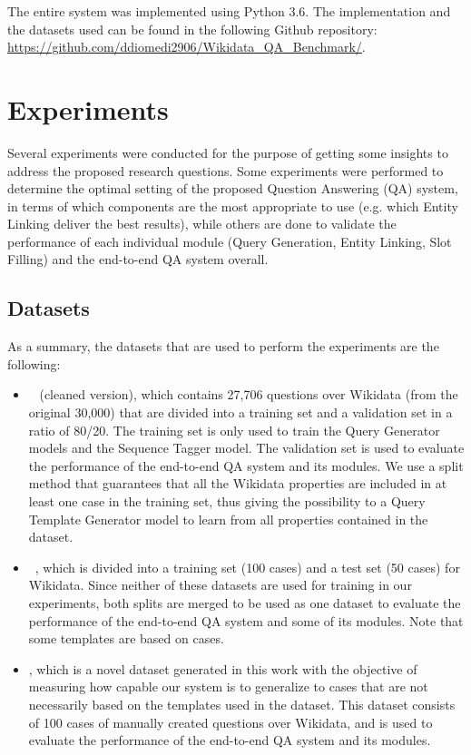 The entire system was implemented using Python 3.6. The implementation and the datasets used can 
be found in the following Github repository: \url{https://github.com/ddiomedi2906/Wikidata_QA_Benchmark/}.

\section{Experiments}
\label{cap4:experimentalDesign/experiments}
Several experiments were conducted for the purpose of getting some insights to address the 
proposed research questions. Some experiments were performed to determine the optimal setting of 
the proposed Question Answering (QA) system, in terms of which components are the most 
appropriate to use (e.g. which Entity Linking deliver the best results), while others are done 
to validate the performance of each individual module (Query Generation, Entity Linking, Slot 
Filling) and the end-to-end QA system overall.

\subsection{Datasets}
\label{cap4:experimentalDesign/datasets}
As a summary, the datasets that are used to perform the experiments are the following:

\begin{itemize}
    \item \LCQuADtwo{}~\cite{dataset:lcquad2-DubeyBA019} (cleaned version), which contains 27,706 
    questions over Wikidata (from the original 30,000) that are divided into a training set and 
    a validation set in a ratio of 80/20. The training set is only used to train the Query 
    Generator models and the Sequence Tagger model. The validation set is used to evaluate the 
    performance of the end-to-end QA system and its modules. We use a split method that 
    guarantees that all the Wikidata properties are included in at least one case in the 
    training set, thus giving the possibility to a Query Template Generator model to learn from 
    all properties contained in the dataset.
    \item \QALDseven{}~\cite{dataset:qald7-UsbeckNHKRN17}, which is divided into a training set (100 
    cases) and a test set (50 cases) for Wikidata. Since neither of these datasets are used for 
    training in our experiments, both splits are merged to be used as one dataset to evaluate 
    the performance of the end-to-end QA system and some of its modules. Note that some \LCQuADtwo{} 
    templates are based on \QALDseven{} cases.
    \item \WikiSPARQL{}, which is a novel dataset generated in this work with the objective of 
    measuring how capable our system is to generalize to cases that are not necessarily based on 
    the templates used in the \LCQuADtwo{} dataset. This dataset consists of 100 cases of manually 
    created questions over Wikidata, and is used to evaluate the performance of the end-to-end 
    QA system and its modules.
\end{itemize}

